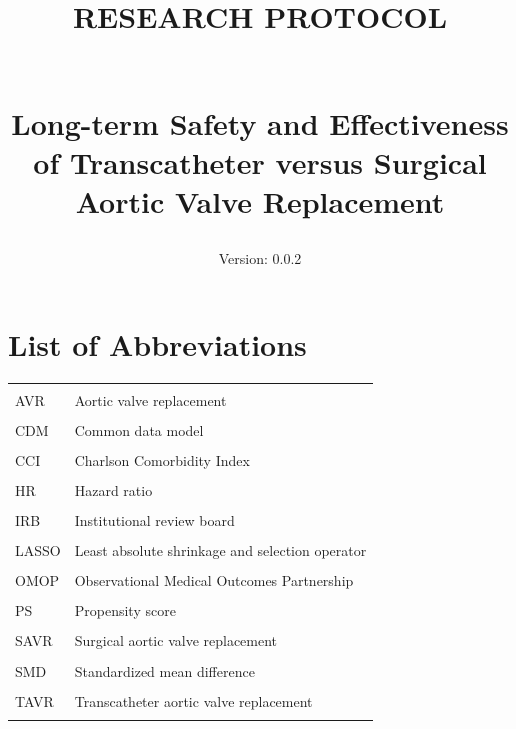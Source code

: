 \documentclass[
  12pt,
]{article}
\title{RESEARCH PROTOCOL\\
\strut \\
Long-term Safety and Effectiveness of Transcatheter versus Surgical
Aortic Valve Replacement}
\subtitle{Version: 0.0.2}
\author{}
\date{\vspace{-2.5em}}
\begin{document}
\maketitle

{
\setcounter{tocdepth}{2}
\tableofcontents
}
\section{List of Abbreviations}\label{list-of-abbreviations}

\begingroup\fontsize{8}{10}\selectfont

\begin{longtable}[t]{ll}
\toprule
 & \\
\midrule
\cellcolor{gray!10}{AS} & \cellcolor{gray!10}{Aortic stenosis}\\
AVR & Aortic valve replacement\\
\cellcolor{gray!10}{BE} & \cellcolor{gray!10}{Balloon-expandable valve}\\
CDM & Common data model\\
\cellcolor{gray!10}{CI} & \cellcolor{gray!10}{Confidence interval}\\
\addlinespace
CCI & Charlson Comorbidity Index\\
\cellcolor{gray!10}{EHR} & \cellcolor{gray!10}{Electronic health record}\\
HR & Hazard ratio\\
\cellcolor{gray!10}{HIRA} & \cellcolor{gray!10}{Health Insurance Review and Assessment Service}\\
IRB & Institutional review board\\
\addlinespace
\cellcolor{gray!10}{KM} & \cellcolor{gray!10}{Kaplan-Meier}\\
LASSO & Least absolute shrinkage and selection operator\\
\cellcolor{gray!10}{OHDSI} & \cellcolor{gray!10}{Observational Health Data Sciences and Informatics}\\
OMOP & Observational Medical Outcomes Partnership\\
\cellcolor{gray!10}{PPI} & \cellcolor{gray!10}{Permanent pacemaker insertion}\\
\addlinespace
PS & Propensity score\\
\cellcolor{gray!10}{RCT} & \cellcolor{gray!10}{Randomized controlled trial}\\
SAVR & Surgical aortic valve replacement\\
\cellcolor{gray!10}{SE} & \cellcolor{gray!10}{Self-expanding valve}\\
SMD & Standardized mean difference\\
\addlinespace
\cellcolor{gray!10}{STS} & \cellcolor{gray!10}{Society of Thoracic Surgeons}\\
TAVR & Transcatheter aortic valve replacement\\
\cellcolor{gray!10}{TCO} & \cellcolor{gray!10}{Target-comparator-outcome}\\
\bottomrule
\end{longtable}
\endgroup{}
\end{document}
